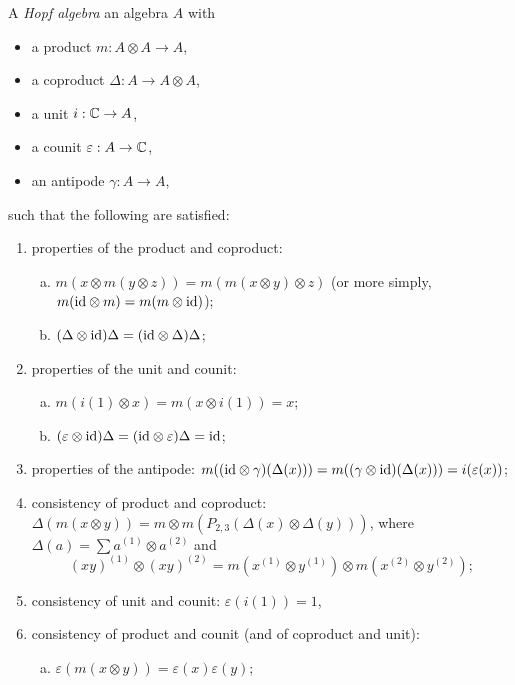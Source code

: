\begin{definition}
  A \emph{Hopf algebra} an algebra $A$ with
  \begin{itemize}
    \item a product
      $m : A \otimes A \to A$,
    \item a coproduct
      $\Delta : A \to A \otimes A$,
    \item a unit $i : \mathbb{C} \to A$,
    \item a counit $\varepsilon : A \to \mathbb{C}$,
    \item an antipode $\gamma : A \to A$,
  \end{itemize}
  such that the following
  are satisfied:
  \begin{enumerate}
    \item properties of the product and
      coproduct:
      \begin{enumerate}[(a)]
        \item $m(x \otimes m(y \otimes z)) = m(m(x \otimes y) \otimes z)$
          (or more simply, $m({\operatorname{id}} \otimes m) = m(m \otimes \operatorname{id})$);
        \item $(\Delta \otimes \operatorname{id}) \Delta = ({\operatorname{id}} \otimes \Delta) \Delta$;
      \end{enumerate}
    \item properties of the unit and counit:
      \begin{enumerate}[(a)]
        \item $m(i(1) \otimes x) = m(x \otimes i(1)) = x$;
        \item $(\varepsilon \otimes \operatorname{id}) \Delta = ({\operatorname{id}} \otimes \varepsilon) \Delta = \operatorname{id}$;
      \end{enumerate}
    \item properties of the antipode:
      $m(({\operatorname{id}} \otimes \gamma)(\Delta(x)))
      = m((\gamma \otimes \operatorname{id})(\Delta(x)))
      = i(\varepsilon(x))$;
    \item consistency of product and coproduct:
      $\Delta(m(x \otimes y)) = m \otimes m(P_{2, 3}(\Delta(x) \otimes \Delta(y)))$, where
      $\Delta(a) = \sum a^{(1)} \otimes a^{(2)}$
      and
      \[
        (xy)^{(1)} \otimes (xy)^{(2)}
        = m(x^{(1)} \otimes y^{(1)}) \otimes m(x^{(2)} \otimes y^{(2)});
      \]
    \item consistency of unit and counit:
      $\varepsilon(i(1)) = 1$,
    \item consistency of product and
      counit (and of coproduct and unit):
      \begin{enumerate}[(a)]
        \item $\varepsilon(m(x \otimes y)) = \varepsilon(x) \varepsilon(y)$;

\end{enumerate}
\end{enumerate}
\end{definition}
